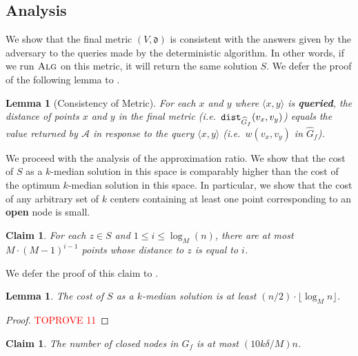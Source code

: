 \documentclass[11pt]{article}
\newcommand{\1}{\mathmybb{1}}
\newtheorem{lemma}[theorem]{Lemma}
\newtheorem{claim}[theorem]{Claim}
\newcommand{\A}{\textsc{Alg}}
\newcommand{\dist}{\textnormal{\texttt{dist}}}
\newcommand{\adv}[0]{\mathcal{A}}
\begin{document}
\subsection{Analysis}

We show that the final metric $(V, \mathfrak d)$ is consistent with the answers given by the adversary to the queries made by the deterministic algorithm.
In other words, if we run $\A$ on this metric, it will return the same solution $S$. 
We defer the proof of the following lemma to .

\begin{lemma}[Consistency of Metric]\label{lem:queried-weights-equal-shortest-paths}
    For each $x$ and $y$ where $\langle x,y \rangle$ is \textbf{queried}, the distance of points $x$ and $y$ in the final metric (i.e.~$\dist_{\widehat G_f}(v_x,v_y)$) equals the value returned by $\adv$ in response to the query $\langle x,y \rangle$ (i.e.~$w(v_x, v_y)$ in $\widehat G_f$).
\end{lemma}

We proceed with the analysis of the approximation ratio.
We show that the cost of $S$ as a $k$-median solution in this space is comparably higher than the cost of the optimum $k$-median solution in this space. In particular, we show that the cost of any arbitrary set of $k$ centers containing at least one point corresponding to an \textbf{open} node is small.

\begin{claim}\label{lem:number-of-neighbours-of-distance-one}
    For each $z \in S$ and $1 \leq i \leq \log_M(n)$, there are at most $M\cdot (M-1)^{i-1}$ points whose distance to $z$ is equal to $i$.
\end{claim}


We defer the proof of this claim to .



\begin{lemma}\label{lem:lower-bound-on-approx-of-Z}
    The cost of $S$ as a $k$-median solution is at least $(n/2) \cdot  \lfloor \log_M n \rfloor $.
\end{lemma}

\begin{proof}\textcolor{red}{TOPROVE 11}\end{proof}




\begin{claim}\label{lem:number-of-closed-nodes}
    The number of closed nodes in $G_f$ is at most $(10k\delta/M)n$.
\end{claim}
\end{document}

